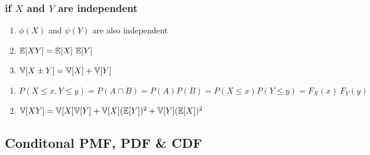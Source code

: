 \subsubsection{if $X$ and $Y$ are independent}

\begin{multicols}{2}
\begin{enumerate}[resume*=calcrulesrv]
    \item $\phi(X)$ and $\psi(Y)$ are also independent
    \hfill \cite{statistics/book/Statistics-for-Data-Scientists/Maurits-Kaptein}

    \item $\mbbE[X Y]  = \mbbE[X]\ \mbbE[Y]$
    \hfill \cite{statistics/book/Statistics-for-Data-Scientists/Maurits-Kaptein}

    \item $\mathbb{V}[X \pm Y] = \mathbb{V}[X] + \mathbb{V}[Y]$
    \hfill \cite{statistics/book/Statistics-for-Data-Scientists/Maurits-Kaptein}

\end{enumerate}
\end{multicols}


\begin{enumerate}[resume*=calcrulesrv]
    \item
    $
        P(X \leq x, Y \leq y)
        = P(A \cap B)
        = P(A) P(B)
        = P(X \leq x) P(Y \leq y)
        = F _X (x)\ F_Y (y)
    $
    \hfill \cite{statistics/book/Statistics-for-Data-Scientists/Maurits-Kaptein}

    \item
    $
        \mathbb{V}[X Y]
        = \mathbb{V}[X] \mathbb{V}[Y] + \mathbb{V}[X](\mathbb{E}[Y])^2 + \mathbb{V}[Y](\mathbb{E}[X])^2
    $
    \hfill \cite{statistics/book/Statistics-for-Data-Scientists/Maurits-Kaptein}
\end{enumerate}


\subsection{Conditonal PMF, PDF \& CDF}

